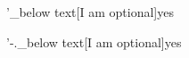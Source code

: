 \documentclass[]{article}
\begin{document}
\mycommand'_{below text}[I am optional]{yes}

\bigskip

\mycommand'-._{below text}[I am optional]{yes}
\end{document}
